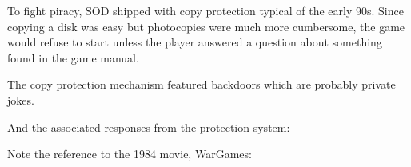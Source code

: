 \documentclass[book.tex]{subfiles}
\begin{document}
   \par
\begin{figure}[H]
\centering
 \end{figure}
 \par

To fight piracy, SOD shipped with copy protection typical of the early 90s. Since copying a disk was easy but photocopies were much more cumbersome, the game would refuse to start unless the player answered a question about something found in the game manual.\\
    \par
\begin{figure}[H]
\centering
 \end{figure}
 \par
 The copy protection mechanism featured backdoors which are probably private jokes.\\
\par
\begin{minipage}{\textwidth}

\end{minipage}
\par
And the associated responses from the protection system:\\
\par
\begin{minipage}{\textwidth}

\end{minipage}
\par
Note the reference to the 1984 movie, WarGames:
    \par
\begin{figure}[H]
\centering
 \end{figure}
 \par
\end{document}
